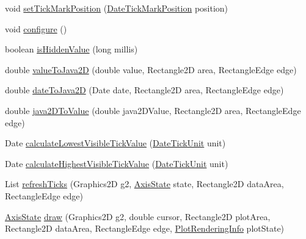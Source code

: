 \begin{DoxyCompactItemize}
\item 
void \mbox{\hyperlink{classorg_1_1jfree_1_1chart_1_1axis_1_1_date_axis_a037470feb7fc76789517fe5f16cd7021}{set\+Tick\+Mark\+Position}} (\mbox{\hyperlink{classorg_1_1jfree_1_1chart_1_1axis_1_1_date_tick_mark_position}{Date\+Tick\+Mark\+Position}} position)
\item 
void \mbox{\hyperlink{classorg_1_1jfree_1_1chart_1_1axis_1_1_date_axis_a9cdde2c745f785eb9965677351d6fba1}{configure}} ()
\item 
boolean \mbox{\hyperlink{classorg_1_1jfree_1_1chart_1_1axis_1_1_date_axis_a067dca22e8cd47316e45584db54fd4a3}{is\+Hidden\+Value}} (long millis)
\item 
double \mbox{\hyperlink{classorg_1_1jfree_1_1chart_1_1axis_1_1_date_axis_a3f62ad97be559de5c42dae00a07af40d}{value\+To\+Java2D}} (double value, Rectangle2D area, Rectangle\+Edge edge)
\item 
double \mbox{\hyperlink{classorg_1_1jfree_1_1chart_1_1axis_1_1_date_axis_ad529ca1a2a46fc687f9a8916fd4e7007}{date\+To\+Java2D}} (Date date, Rectangle2D area, Rectangle\+Edge edge)
\item 
double \mbox{\hyperlink{classorg_1_1jfree_1_1chart_1_1axis_1_1_date_axis_a582a0d5f440a7a75208a64d171dcf703}{java2\+D\+To\+Value}} (double java2\+D\+Value, Rectangle2D area, Rectangle\+Edge edge)
\item 
Date \mbox{\hyperlink{classorg_1_1jfree_1_1chart_1_1axis_1_1_date_axis_a184849ce6ba78db3e925df10b28f3c0a}{calculate\+Lowest\+Visible\+Tick\+Value}} (\mbox{\hyperlink{classorg_1_1jfree_1_1chart_1_1axis_1_1_date_tick_unit}{Date\+Tick\+Unit}} unit)
\item 
Date \mbox{\hyperlink{classorg_1_1jfree_1_1chart_1_1axis_1_1_date_axis_a203345960a90a09866979c930de7e1a0}{calculate\+Highest\+Visible\+Tick\+Value}} (\mbox{\hyperlink{classorg_1_1jfree_1_1chart_1_1axis_1_1_date_tick_unit}{Date\+Tick\+Unit}} unit)
\item 
List \mbox{\hyperlink{classorg_1_1jfree_1_1chart_1_1axis_1_1_date_axis_a44c04e6d76a04ce86228f97dcee753ed}{refresh\+Ticks}} (Graphics2D g2, \mbox{\hyperlink{classorg_1_1jfree_1_1chart_1_1axis_1_1_axis_state}{Axis\+State}} state, Rectangle2D data\+Area, Rectangle\+Edge edge)
\item 
\mbox{\hyperlink{classorg_1_1jfree_1_1chart_1_1axis_1_1_axis_state}{Axis\+State}} \mbox{\hyperlink{classorg_1_1jfree_1_1chart_1_1axis_1_1_date_axis_a23502848e414d14470e13a660e4b061a}{draw}} (Graphics2D g2, double cursor, Rectangle2D plot\+Area, Rectangle2D data\+Area, Rectangle\+Edge edge, \mbox{\hyperlink{classorg_1_1jfree_1_1chart_1_1plot_1_1_plot_rendering_info}{Plot\+Rendering\+Info}} plot\+State)

\end{DoxyCompactItemize}
